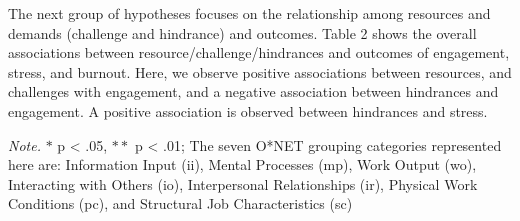 \documentclass[
  man]{apa7}
\newenvironment{lltable}{\begin{landscape}\centering\begin{ThreePartTable}}{\end{ThreePartTable}\end{landscape}}
\begin{document}
The next group of hypotheses focuses on the relationship among resources and demands (challenge and hindrance) and outcomes. Table 2 shows the overall associations between resource/challenge/hindrances and outcomes of engagement, stress, and burnout. Here, we observe positive associations between resources, and challenges with engagement, and a negative association between hindrances and engagement. A positive association is observed between hindrances and stress.

\begin{lltable}

\begin{TableNotes}[para]
\normalsize{\textit{Note.} $*$ p < .05, $**$ p < .01; The seven O*NET grouping categories represented here are: Information Input (ii), Mental Processes (mp), Work Output (wo), Interacting with Others (io), Interpersonal Relationships (ir), Physical Work Conditions (pc), and Structural Job Characteristics (sc)}
\end{TableNotes}

\tiny{

}
\end{lltable}
\end{document}
